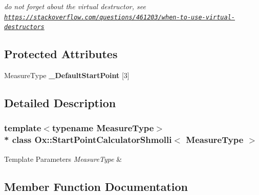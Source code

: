 \begin{DoxyCompactItemize}
\begin{DoxyCompactList}\small\item\em do not forget about the virtual destructor, see \href{https://stackoverflow.com/questions/461203/when-to-use-virtual-destructors}{\tt https\+://stackoverflow.\+com/questions/461203/when-\/to-\/use-\/virtual-\/destructors} \end{DoxyCompactList}\end{DoxyCompactItemize}
\subsection*{Protected Attributes}
\begin{DoxyCompactItemize}
\item 
Measure\+Type {\bfseries \+\_\+\+Default\+Start\+Point} \mbox{[}3\mbox{]}\hypertarget{class_ox_1_1_start_point_calculator_shmolli_acb458533b900c9088d1dd7be30183ba0}{}\label{class_ox_1_1_start_point_calculator_shmolli_acb458533b900c9088d1dd7be30183ba0}

\end{DoxyCompactItemize}


\subsection{Detailed Description}
\subsubsection*{template$<$typename Measure\+Type$>$\\*
class Ox\+::\+Start\+Point\+Calculator\+Shmolli$<$ Measure\+Type $>$}


\begin{DoxyTemplParams}{Template Parameters}
{\em Measure\+Type} & \\
\hline
\end{DoxyTemplParams}


\subsection{Member Function Documentation}
